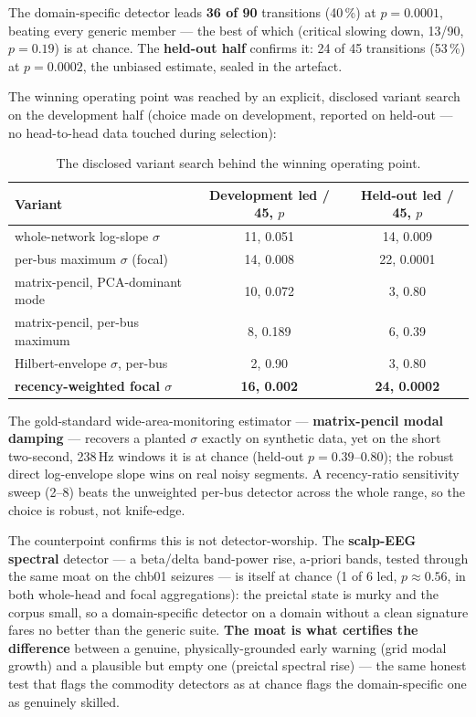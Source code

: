 \documentclass[11pt]{article}
\begin{document}
The domain-specific detector leads \textbf{36 of 90} transitions
(40\,\%) at $p = 0.0001$, beating every generic member --- the best of
which (critical slowing down, 13/90, $p = 0.19$) is at chance. The
\textbf{held-out half} confirms it: 24 of 45 transitions (53\,\%) at
$p = 0.0002$, the unbiased estimate, sealed in the artefact.

The winning operating point was reached by an explicit, disclosed
variant search on the development half (choice made on development,
reported on held-out --- no head-to-head data touched during selection):

\begin{table}[h!]
\centering
\small
\begin{tabular}{lcc}
\toprule
Variant & Development led / 45, $p$ & Held-out led / 45, $p$ \\
\midrule
whole-network log-slope $\sigma$ & 11, 0.051 & 14, 0.009 \\
per-bus maximum $\sigma$ (focal) & 14, 0.008 & 22, 0.0001 \\
matrix-pencil, PCA-dominant mode & 10, 0.072 & 3, 0.80 \\
matrix-pencil, per-bus maximum & 8, 0.189 & 6, 0.39 \\
Hilbert-envelope $\sigma$, per-bus & 2, 0.90 & 3, 0.80 \\
\textbf{recency-weighted focal $\sigma$} & \textbf{16, 0.002} & \textbf{24, 0.0002} \\
\bottomrule
\end{tabular}
\caption{The disclosed variant search behind the winning operating point.}
\end{table}

The gold-standard wide-area-monitoring estimator --- \textbf{matrix-pencil
modal damping} --- recovers a planted $\sigma$ exactly on synthetic data,
yet on the short two-second, 238\,Hz windows it is at chance (held-out
$p = 0.39$--$0.80$); the robust direct log-envelope slope wins on real
noisy segments. A recency-ratio sensitivity sweep (2--8) beats the
unweighted per-bus detector across the whole range, so the choice is
robust, not knife-edge.

The counterpoint confirms this is not detector-worship. The
\textbf{scalp-EEG spectral} detector --- a beta/delta band-power rise,
a-priori bands, tested through the same moat on the chb01 seizures ---
is itself at chance (1 of 6 led, $p \approx 0.56$, in both whole-head
and focal aggregations): the preictal state is murky and the corpus
small, so a domain-specific detector on a domain without a clean
signature fares no better than the generic suite. \textbf{The moat is
what certifies the difference} between a genuine, physically-grounded
early warning (grid modal growth) and a plausible but empty one
(preictal spectral rise) --- the same honest test that flags the
commodity detectors as at chance flags the domain-specific one as
genuinely skilled.
\end{document}
